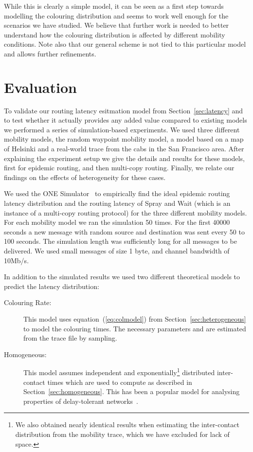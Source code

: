 \documentclass{article}
\begin{document}
While this is clearly a simple model, it can be seen as a first step
towards modelling the colouring distribution and seems to work well
enough for the scenarios we have studied. We believe that further work
is needed to better understand how the colouring distribution is
affected by different mobility conditions. Note also that our general
scheme is not tied to this particular model and allows further
refinements.
    
\section{Evaluation}
\label{sec:evaluation}

To validate our routing latency esitmation model from Section~\ref{sec:latency} and to test whether it actually provides any
added value compared to existing models we performed a series of
simulation-based experiments. We used three different mobility models,
the random waypoint mobility model, a model based on a map of Helsinki
and a real-world trace from the cabs in the San Francisco area. After
explaining the experiment setup we give the details and results for
these models, first for epidemic routing, and then multi-copy
routing. Finally, we relate our findings on the effects of
heterogeneity for these cases.

We used the ONE Simulator~\cite{keranen09a} to empirically find the
ideal epidemic routing latency distribution and the routing latency of
Spray and Wait (which is an instance of a multi-copy routing
protocol) for the three different mobility models. For each mobility
model we ran the simulation 50 times. For the first 40000 seconds a
new message with random source and destination was sent every 50 to
100 seconds. The simulation length was sufficiently long for all
messages to be delivered. We used small messages of size 1 byte, and
channel bandwidth of 10Mb/s.

In addition to the simulated results we used two different
theoretical models to predict the latency distribution:

\begin{description}
\item[Colouring Rate:] This model uses equation~(\ref{eq:colmodel}) from
  Section~\ref{sec:heterogeneous} to model the colouring times. The
  necessary parameters  and  are estimated from the
  trace file by sampling.
\item[Homogeneous:] This model assumes independent and
  exponentially\footnote{We also obtained nearly identical results
    when estimating the inter-contact distribution from the mobility
    trace, which we have excluded for lack of space.} distributed
  inter-contact times which are used to compute  as
  described in Section~\ref{sec:homogeneous}. This has been a popular
  model for analysing properties of delay-tolerant
  networks~\cite{resta11,spyropoulos08,zhang07}.
\end{description}
\end{document}
